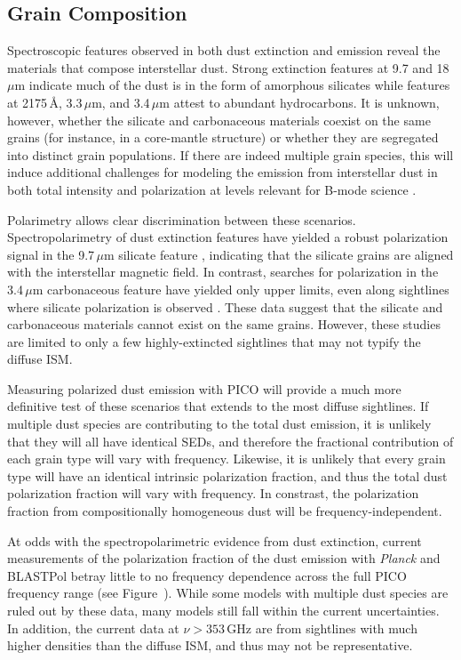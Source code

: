 \documentclass[PICOReport.tex]{subfiles}
\begin{document}
\subsection{Grain Composition}
Spectroscopic features observed in both dust extinction and emission reveal the materials that compose interstellar dust. Strong extinction features at 9.7 and 18\,$\mu$m indicate much of the dust is in the form of amorphous silicates while features at 2175\,\AA, 3.3\,$\mu$m, and 3.4\,$\mu$m attest to abundant hydrocarbons. It is unknown, however, whether the silicate and carbonaceous materials coexist on the same grains (for instance, in a core-mantle structure) or whether they are segregated into distinct grain populations. If there are indeed multiple grain species, this will induce additional challenges for modeling the emission from interstellar dust in both total intensity and polarization at levels relevant for B-mode science \citep{Hensley2018}.

Polarimetry allows clear discrimination between these scenarios. Spectropolarimetry of dust extinction features have yielded a robust polarization signal in the 9.7\,$\mu$m silicate feature \citep[e.g.,][]{Smith2000}, indicating that the silicate grains are aligned with the interstellar magnetic field. In contrast, searches for polarization in the 3.4\,$\mu$m carbonaceous feature have yielded only upper limits, even along sightlines where silicate polarization is observed \citep{Chiar2006,Mason2007}. These data suggest that the silicate and carbonaceous materials cannot exist on the same grains. However, these studies are limited to only a few highly-extincted sightlines that may not typify the diffuse ISM.

Measuring polarized dust emission with PICO will provide a much more definitive test of these scenarios that extends to the most diffuse sightlines. If multiple dust species are contributing to the total dust emission, it is unlikely that they will all have identical SEDs, and therefore the fractional contribution of each grain type will vary with frequency. Likewise, it is unlikely that every grain type will have an identical intrinsic polarization fraction, and thus the total dust polarization fraction will vary with frequency. In constrast, the polarization fraction from compositionally homogeneous dust will be frequency-independent.

At odds with the spectropolarimetric evidence from dust extinction, current measurements of the polarization fraction of the dust emission with {\it Planck} \citep{Planck_Int_XXII} and BLASTPol \citep{Ashton2018} betray little to no frequency dependence across the full PICO frequency range (see Figure~). While some models with multiple dust species are ruled out by these data, many models still fall within the current uncertainties. In addition, the current data at $\nu > 353\,$GHz are from sightlines with much higher densities than the diffuse ISM, and thus may not be representative. 
\end{document}
